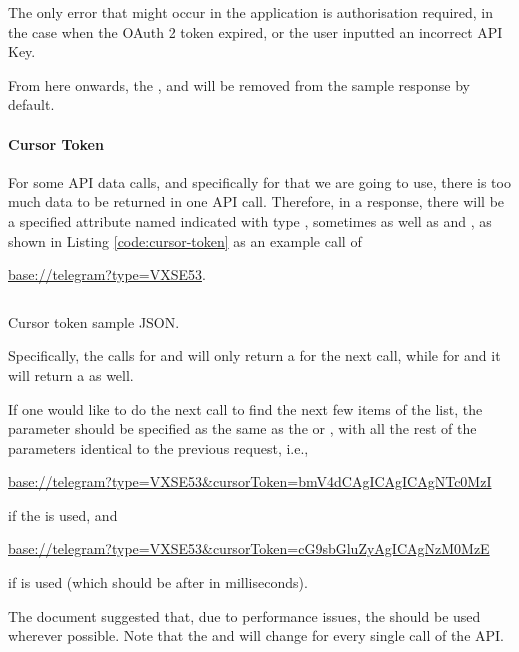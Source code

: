 The only error that might occur in the application is  authorisation required, in the case when the OAuth 2 token expired, or the user inputted an incorrect API Key.

From here onwards, the ,  and  will be removed from the sample response by default.

\paragraph{Cursor Token}

For some API data calls, and specifically for  that we are going to use, there is too much data to be returned in one API call. Therefore, in a response, there will be a specified attribute named  indicated with type , sometimes as well as  and , as shown in Listing \ref{code:cursor-token} as an example call of
\begin{center}
    \url{base://telegram?type=VXSE53}.
\end{center}

\begin{listing}[htp]
    \inputminted{json}{code/CursorToken.json}
    \caption{Cursor token sample JSON.}
    \label{code:cursor-token}
\end{listing}

Specifically, the calls for  and  will only return a  for the next call, while for  and  it will return a  as well.

If one would like to do the next call to find the next few items of the list, the  parameter should be specified as the same as the  or , with all the rest of the parameters identical to the previous request, i.e.,
\begin{center}
    \url{base://telegram?type=VXSE53&cursorToken=bmV4dCAgICAgICAgNTc0MzI}
\end{center}
if the  is used, and
\begin{center}
    \url{base://telegram?type=VXSE53&cursorToken=cG9sbGluZyAgICAgNzM0MzE}
\end{center}
if  is used (which should be after  in milliseconds).

The document suggested that, due to performance issues, the  should be used wherever possible. Note that the  and  will change for every single call of the API.

